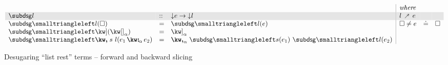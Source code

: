 \begin{figure}[H]
\small
$\begin{array}{lll|llll}
   \arrayrulecolor{lightgray}
   &&&\textit{where}
   \\
   \rowcolor{verylightgray}
   \desugarGC{l} &::& \Below{e} \to \Below{l}
   & l \desugarFwd e
   &&
   \\
   \desugarBwdF{l}(\hole)
   &=&
   \desugarBwdF{l}(e)
   &
   \hole \neq e &\eq& \hole
   \\
   \desugarBwdF{\exListEnd}(\annot{\exNil}{\alpha})
   &=&
   \annot{\exListEnd}{\alpha}
   \\
   \desugarBwdF{\exListNext{s}{l}}(\annCons{e_1}{e_2}{\alpha})
   &=&
   \annListNext{\desugarBwdF{s}(e_1)}{\desugarBwdF{l}(e_2)}{\alpha}
\end{array}$
\caption{Desugaring ``list rest'' terms -- forward and backward slicing}
\end{figure}
